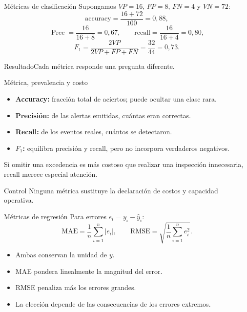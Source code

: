 \documentclass[aspectratio=169,10pt]{beamer}
\newcommand{\concepto}[1]{\textcolor{UAPTeal}{\textbf{#1}}}
\begin{document}
\begin{frame}{Métricas de clasificación}
  \small
  Supongamos $VP=16$, $FP=8$, $FN=4$ y $VN=72$:
  \[
    \mathrm{accuracy}=\frac{16+72}{100}=0{,}88,
  \]
  \[
    \operatorname{Prec}=\frac{16}{16+8}=0{,}67,\qquad
    \mathrm{recall}=\frac{16}{16+4}=0{,}80,
  \]
  \[
    F_1=\frac{2VP}{2VP+FP+FN}=\frac{32}{44}=0{,}73.
  \]
  \begin{block}{Resultado}Cada métrica responde una pregunta diferente.\end{block}
\end{frame}

\begin{frame}{Métrica, prevalencia y costo}
  \small
  \begin{itemize}
    \item \concepto{Accuracy:} fracción total de aciertos; puede ocultar una clase rara.
    \item \concepto{Precisión:} de las alertas emitidas, cuántas eran correctas.
    \item \concepto{Recall:} de los eventos reales, cuántos se detectaron.
    \item \concepto{$F_1$:} equilibra precisión y recall, pero no incorpora verdaderos negativos.
  \end{itemize}
  Si omitir una excedencia es más costoso que realizar una inspección innecesaria, recall merece especial atención.
  \begin{alertblock}{Control}
    Ninguna métrica sustituye la declaración de costos y capacidad operativa.
  \end{alertblock}
\end{frame}

\begin{frame}{Métricas de regresión}
  \small
  Para errores $e_i=y_i-\widehat y_i$:
  \[
    \mathrm{MAE}=\frac{1}{n}\sum_{i=1}^n|e_i|,
    \qquad
    \mathrm{RMSE}=\sqrt{\frac{1}{n}\sum_{i=1}^n e_i^2}.
  \]
  \begin{itemize}
    \item Ambas conservan la unidad de $y$.
    \item MAE pondera linealmente la magnitud del error.
    \item RMSE penaliza más los errores grandes.
    \item La elección depende de las consecuencias de los errores extremos.
  \end{itemize}
\end{frame}
\end{document}
